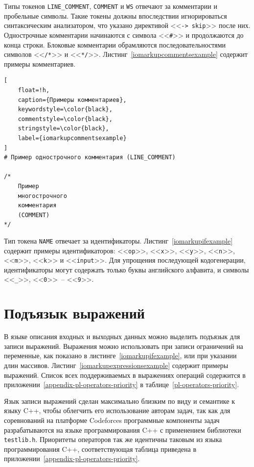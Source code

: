 \documentclass[times,specification,annotation]{style/itmo-student-thesis/itmo-student-thesis}
\begin{document}
Типы токенов \texttt{LINE\_COMMENT}, \texttt{COMMENT} и \texttt{WS} отвечают за комментарии и пробельные символы. Такие токены должны впоследствии игнорироваться синтаксическим анализатором, что указано директивой <<\texttt{-> skip}>> после них. Однострочные комментарии начинаются с символа <<\texttt{\#}>> и продолжаются до конца строки. Блоковые комментарии обрамляются последовательностями символов <<\texttt{/*}>> и <<\texttt{*/}>>. Листинг~\ref{iomarkupcommentsexample} содержит примеры комментариев.

\begin{lstlisting}[
    float=!h,
    caption={Примеры комментариев},
    keywordstyle=\color{black},
    commentstyle=\color{black},
    stringstyle=\color{black},
    label={iomarkupcommentsexample}
]
# Пример однострочного комментария (LINE_COMMENT)

/*
    Пример
    многострочного
    комментария
    (COMMENT)
*/
\end{lstlisting}

Тип токена \texttt{NAME} отвечает за идентификаторы. Листинг~\ref{iomarkupifexample} содержит примеры идентификаторов: <<\texttt{op}>>, <<\texttt{x}>>, <<\texttt{y}>>, <<\texttt{n}>>, <<\texttt{m}>>, <<\texttt{k}>> и <<\texttt{input}>>. Для упрощения последующей кодогенерации, идентификаторы могут содержать только буквы английского алфавита, и символы <<\texttt{\_}>>, <<\texttt{0}>>~-- <<\texttt{9}>>.

\section{Подъязык выражений}\label{syntax-pl-section}

В языке описания входных и выходных данных можно выделить подъязык для записи выражений. Выражения можно использовать при записи ограничений на переменные, как показано в листинге~\ref{iomarkupifexample}, или при указании длин массивов. Листинг~\ref{iomarkupexpressionsexample} содержит примеры выражений. Список всех поддерживаемых в выражениях операций содержится в приложении~\ref{appendix-pl-operators-priority} в таблице~\ref{pl-operators-priority}.

Язык записи выражений сделан максимально близким по виду и семантике к языку C++, чтобы облегчить его использование авторам задач, так как для соревнований на платформе Codeforces программные компоненты задач разрабатываются на языке программирования C++ с применением библиотеки \texttt{testlib.h}. Приоритеты операторов так же идентичны таковым из языка программирования C++, соответствующая таблица приведена в приложении~\ref{appendix-pl-operators-priority}.
\end{document}
